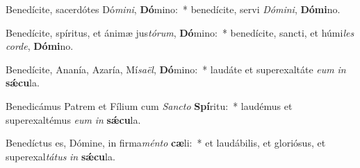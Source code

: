 \item Benedícite, sacerdótes Dó\textit{mi}\textit{ni}, \textbf{Dó}mino:~* benedícite, servi \textit{Dó}\textit{mi}\textit{ni}, \textbf{Dó}\textbf{mi}no.
\item Benedícite, spíritus, et ánimæ jus\textit{tó}\textit{rum}, \textbf{Dó}mino:~* benedícite, sancti, et húmi\textit{les} \textit{cor}\textit{de}, \textbf{Dó}\textbf{mi}no.
\item Benedícite, Ananía, Azaría, Mí\textit{sa}\textit{ël}, \textbf{Dó}mino:~* laudáte et superexaltáte \textit{e}\textit{um} \textit{in} \textbf{sǽ}\textbf{cu}la.
\item Benedicámus Patrem et Fílium cum \textit{Sanc}\textit{to} \textbf{Spí}ritu:~* laudémus et superexaltémus \textit{e}\textit{um} \textit{in} \textbf{sǽ}\textbf{cu}la.
\item Benedíctus es, Dómine, in firma\textit{mén}\textit{to} \textbf{cæ}li:~* et laudábilis, et gloriósus, et superexal\textit{tá}\textit{tus} \textit{in} \textbf{sǽ}\textbf{cu}la.
